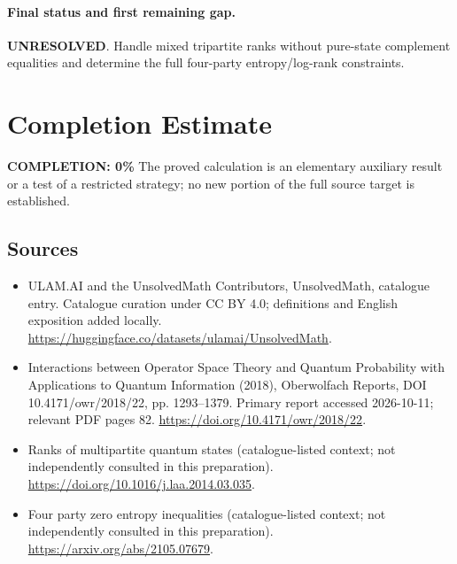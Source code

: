\documentclass[11pt]{article}
\begin{document}
\paragraph{Final status and first remaining gap.}
\textbf{UNRESOLVED}. Handle mixed tripartite ranks without pure-state complement equalities and determine the full four-party entropy/log-rank constraints.

\section{Completion Estimate}
\noindent\textbf{COMPLETION: 0\%}
The proved calculation is an elementary auxiliary result or a test of a restricted strategy; no new portion of the full source target is established.

\subsection{Sources}
\begin{itemize}
\item[\hypertarget{source:statement:1}{S1}] ULAM.AI and the UnsolvedMath Contributors, UnsolvedMath, catalogue entry. Catalogue curation under CC BY 4.0; definitions and English exposition added locally.
\url{https://huggingface.co/datasets/ulamai/UnsolvedMath}.
\item[\hypertarget{source:statement:2}{S2}] Interactions between Operator Space Theory and Quantum Probability with Applications to Quantum Information (2018), Oberwolfach Reports, DOI 10.4171/owr/2018/22, pp. 1293--1379. Primary report accessed 2026-10-11; relevant PDF pages 82.
\url{https://doi.org/10.4171/owr/2018/22}.
\item[\hypertarget{source:statement:3}{S3}] Ranks of multipartite quantum states (catalogue-listed context; not independently consulted in this preparation).
\url{https://doi.org/10.1016/j.laa.2014.03.035}.
\item[\hypertarget{source:statement:4}{S4}] Four party zero entropy inequalities (catalogue-listed context; not independently consulted in this preparation).
\url{https://arxiv.org/abs/2105.07679}.
\end{itemize}
\label{end:statement}
\end{document}
